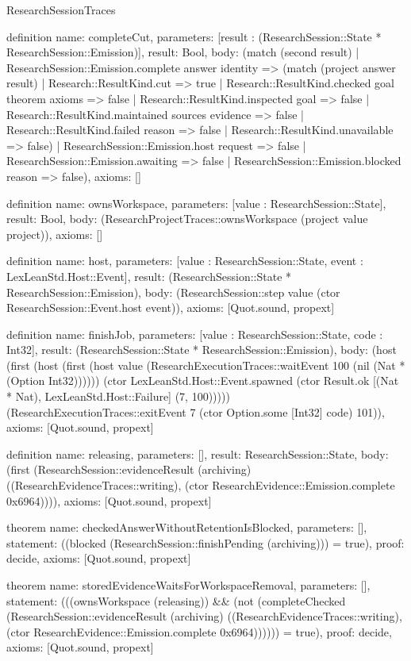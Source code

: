 \begin{lexlean}{ResearchSessionTraces}
\begin{semanticmodule}
definition{
 name: completeCut,
 parameters: [result : (ResearchSession::State * ResearchSession::Emission)],
 result: Bool,
 body: (match (second result) | ResearchSession::Emission.complete answer identity => (match (project answer result) | Research::ResultKind.cut => true | Research::ResultKind.checked goal theorem axioms => false | Research::ResultKind.inspected goal => false | Research::ResultKind.maintained sources evidence => false | Research::ResultKind.failed reason => false | Research::ResultKind.unavailable => false) | ResearchSession::Emission.host request => false | ResearchSession::Emission.awaiting => false | ResearchSession::Emission.blocked reason => false),
 axioms: []
}

definition{
 name: ownsWorkspace,
 parameters: [value : ResearchSession::State],
 result: Bool,
 body: (ResearchProjectTraces::ownsWorkspace (project value project)),
 axioms: []
}

definition{
 name: host,
 parameters: [value : ResearchSession::State, event : LexLeanStd.Host::Event],
 result: (ResearchSession::State * ResearchSession::Emission),
 body: (ResearchSession::step value (ctor ResearchSession::Event.host event)),
 axioms: [Quot.sound, propext]
}

definition{
 name: finishJob,
 parameters: [value : ResearchSession::State, code : Int32],
 result: (ResearchSession::State * ResearchSession::Emission),
 body: (host (first (host (first (host value (ResearchExecutionTraces::waitEvent 100 (nil (Nat * (Option Int32)))))) (ctor LexLeanStd.Host::Event.spawned (ctor Result.ok [(Nat * Nat), LexLeanStd.Host::Failure] (7, 100))))) (ResearchExecutionTraces::exitEvent 7 (ctor Option.some [Int32] code) 101)),
 axioms: [Quot.sound, propext]
}

definition{
 name: releasing,
 parameters: [],
 result: ResearchSession::State,
 body: (first (ResearchSession::evidenceResult (archiving) ((ResearchEvidenceTraces::writing), (ctor ResearchEvidence::Emission.complete 0x6964)))),
 axioms: [Quot.sound, propext]
}

theorem{
 name: checkedAnswerWithoutRetentionIsBlocked,
 parameters: [],
 statement: ((blocked (ResearchSession::finishPending (archiving))) = true),
 proof: decide{},
 axioms: [Quot.sound, propext]
}

theorem{
 name: storedEvidenceWaitsForWorkspaceRemoval,
 parameters: [],
 statement: (((ownsWorkspace (releasing)) && (not (completeChecked (ResearchSession::evidenceResult (archiving) ((ResearchEvidenceTraces::writing), (ctor ResearchEvidence::Emission.complete 0x6964)))))) = true),
 proof: decide{},
 axioms: [Quot.sound, propext]
}


\end{semanticmodule}
\end{lexlean}
